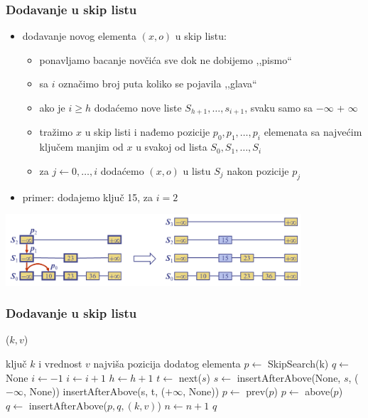 \documentclass[compress,aspectratio=169]{beamer}
\renewcommand{\algorithmiccomment}[1]{\hfill \{\myred{#1}\}}
\begin{document}
\begin{frame}[fragile]
  \frametitle{Dodavanje u skip listu}
  \begin{itemize}
    \item dodavanje novog elementa $(x, o)$ u skip listu:
    \begin{itemize}
      \item ponavljamo bacanje novčića sve dok ne dobijemo ,,pismo``
      \item sa $i$ označimo broj puta koliko se pojavila ,,glava``
      \item ako je $i \geq h$ dodaćemo nove liste $S_{h+1}, \ldots, s_{i+1}$, svaku samo sa $-\infty$ + $\infty$
      \item tražimo $x$ u skip listi i nađemo pozicije $p_0, p_1, \ldots, p_i$ elemenata sa najvećim ključem manjim od $x$ u svakoj od lista $S_0, S_1, \ldots, S_i$
      \item za $j\leftarrow 0, \ldots, i$ dodaćemo $(x, o)$ u listu $S_j$ nakon pozicije $p_j$
    \end{itemize}
    \item primer: dodajemo ključ 15, za $i=2$ 
  \end{itemize}
  \begin{center}
    \includegraphics[width=11cm]{asp-10-pic13.png}
  \end{center}
\end{frame}

\renewcommand{\algorithmiccomment}[1]{\hfill \{\myred{#1}\}}

\begin{frame}
\frametitle{Dodavanje u skip listu}
($k, v$)
\begin{algorithmic}
\REQUIRE ključ $k$ i vrednost $v$
\ENSURE najviša pozicija dodatog elementa
\STATE $p \leftarrow$ SkipSearch(k)
\STATE $q \leftarrow$ None 
\STATE $i \leftarrow -1$
\REPEAT
  \STATE $i\leftarrow i+1$
    \STATE $h \leftarrow h + 1$ 
    \STATE $t \leftarrow$ next($s$)
    \STATE $s \leftarrow$ insertAfterAbove(None, $s$, ($-\infty$, None)) 
    \STATE insertAfterAbove(s, t, ($+\infty$, None)) 
  \ENDIF
    \STATE $p \leftarrow$ prev($p$) 
  \ENDWHILE
  \STATE $p \leftarrow$ above($p$) 
  \STATE $q \leftarrow$ insertAfterAbove($p,q,(k,v)$) 
\STATE $n \leftarrow n + 1$
\RETURN $q$
\end{algorithmic}
\end{frame}
\end{document}
